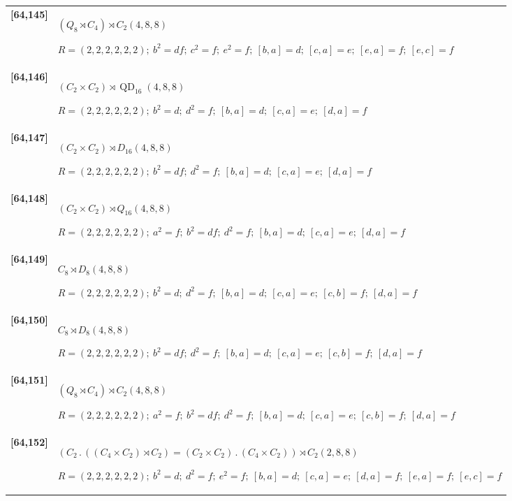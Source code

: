 \documentclass[UTF8,fontset=fandol,11pt,a4paper]{ctexart}
\begin{document}
\begin{longtable}{@{}p{17mm}>{\raggedright\arraybackslash}p{141mm}@{}}
\textbf{[64,145]} & $(Q_{8}\rtimes C_{4})\rtimes C_{2}$\quad $(4,8,8)$\par\(R=(2,2,2,2,2,2);\allowbreak\ b^{2}=df;\allowbreak\ c^{2}=f;\allowbreak\ e^{2}=f;\allowbreak\ [b,a]=d;\allowbreak\ [c,a]=e;\allowbreak\ [e,a]=f;\allowbreak\ [e,c]=f\)\\[3pt]

\textbf{[64,146]} & $(C_{2}\times C_{2})\rtimes \operatorname{QD}_{16}$\quad $(4,8,8)$\par\(R=(2,2,2,2,2,2);\allowbreak\ b^{2}=d;\allowbreak\ d^{2}=f;\allowbreak\ [b,a]=d;\allowbreak\ [c,a]=e;\allowbreak\ [d,a]=f\)\\[3pt]

\textbf{[64,147]} & $(C_{2}\times C_{2})\rtimes D_{16}$\quad $(4,8,8)$\par\(R=(2,2,2,2,2,2);\allowbreak\ b^{2}=df;\allowbreak\ d^{2}=f;\allowbreak\ [b,a]=d;\allowbreak\ [c,a]=e;\allowbreak\ [d,a]=f\)\\[3pt]

\textbf{[64,148]} & $(C_{2}\times C_{2})\rtimes Q_{16}$\quad $(4,8,8)$\par\(R=(2,2,2,2,2,2);\allowbreak\ a^{2}=f;\allowbreak\ b^{2}=df;\allowbreak\ d^{2}=f;\allowbreak\ [b,a]=d;\allowbreak\ [c,a]=e;\allowbreak\ [d,a]=f\)\\[3pt]

\textbf{[64,149]} & $C_{8}\rtimes D_{8}$\quad $(4,8,8)$\par\(R=(2,2,2,2,2,2);\allowbreak\ b^{2}=d;\allowbreak\ d^{2}=f;\allowbreak\ [b,a]=d;\allowbreak\ [c,a]=e;\allowbreak\ [c,b]=f;\allowbreak\ [d,a]=f\)\\[3pt]

\textbf{[64,150]} & $C_{8}\rtimes D_{8}$\quad $(4,8,8)$\par\(R=(2,2,2,2,2,2);\allowbreak\ b^{2}=df;\allowbreak\ d^{2}=f;\allowbreak\ [b,a]=d;\allowbreak\ [c,a]=e;\allowbreak\ [c,b]=f;\allowbreak\ [d,a]=f\)\\[3pt]

\textbf{[64,151]} & $(Q_{8}\rtimes C_{4})\rtimes C_{2}$\quad $(4,8,8)$\par\(R=(2,2,2,2,2,2);\allowbreak\ a^{2}=f;\allowbreak\ b^{2}=df;\allowbreak\ d^{2}=f;\allowbreak\ [b,a]=d;\allowbreak\ [c,a]=e;\allowbreak\ [c,b]=f;\allowbreak\ [d,a]=f\)\\[3pt]

\textbf{[64,152]} & $(C_{2}\mathbin{.} ((C_{4}\times C_{2})\rtimes C_{2}) = (C_{2}\times C_{2})\mathbin{.} (C_{4}\times C_{2}))\rtimes C_{2}$\quad $(2,8,8)$\par\(R=(2,2,2,2,2,2);\allowbreak\ b^{2}=d;\allowbreak\ d^{2}=f;\allowbreak\ e^{2}=f;\allowbreak\ [b,a]=d;\allowbreak\ [c,a]=e;\allowbreak\ [d,a]=f;\allowbreak\ [e,a]=f;\allowbreak\ [e,c]=f\)\\[3pt]


\end{longtable}
\end{document}
